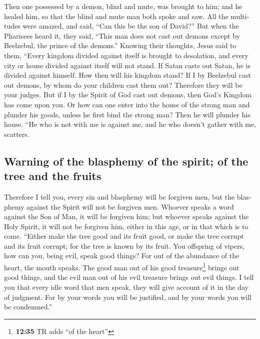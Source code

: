 \begin{paracol}{2}
\begin{otherlanguage}{english}
 Then one possessed by a demon, blind and mute, was
brought to him; and he healed him, so that the blind and mute man both
spoke and saw.  All the multitudes were amazed, and said,
``Can this be the son of David?''  But when the Pharisees
heard it, they said, ``This man does not cast out demons except by
Beelzebul, the prince of the demons.''  Knowing their
thoughts, Jesus said to them, ``Every kingdom divided against itself is
brought to desolation, and every city or house divided against itself
will not stand.  If Satan casts out Satan, he is divided
against himself. How then will his kingdom stand?  If I
by Beelzebul cast out demons, by whom do your children cast them out?
Therefore they will be your judges.  But if I by the
Spirit of God cast out demons, then God's Kingdom has come upon you.
 Or how can one enter into the house of the strong man
and plunder his goods, unless he first bind the strong man? Then he will
plunder his house.  ``He who is not with me is against
me, and he who doesn't gather with me, scatters.

\hypertarget{warning-of-the-blasphemy-of-the-spirit-of-the-tree-and-the-fruits}{%
\subsection{Warning of the blasphemy of the spirit; of the tree and the
fruits}\label{warning-of-the-blasphemy-of-the-spirit-of-the-tree-and-the-fruits}}

 Therefore I tell you, every sin and blasphemy will be
forgiven men, but the blasphemy against the Spirit will not be forgiven
men.  Whoever speaks a word against the Son of Man, it
will be forgiven him; but whoever speaks against the Holy Spirit, it
will not be forgiven him, either in this age, or in that which is to
come.  ``Either make the tree good and its fruit good, or
make the tree corrupt and its fruit corrupt; for the tree is known by
its fruit.  You offspring of vipers, how can you, being
evil, speak good things? For out of the abundance of the heart, the
mouth speaks.  The good man out of his good
treasure\footnote{\textbf{12:35} TR adds ``of the heart''} brings out
good things, and the evil man out of his evil treasure brings out evil
things.  I tell you that every idle word that men speak,
they will give account of it in the day of judgment.  For
by your words you will be justified, and by your words you will be
condemned.''


\end{otherlanguage}
\end{paracol}
